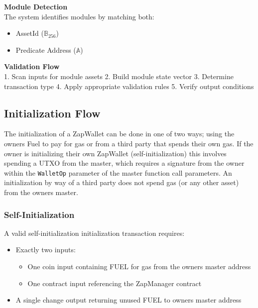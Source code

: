 \textbf{Module Detection}\\
The system identifies modules by matching both:
\begin{itemize}
    \item AssetId ($\mathbb{B}_{256}$)
    \item Predicate Address ($\mathbb{A}$)
\end{itemize}

\textbf{Validation Flow}\\
1. Scan inputs for module assets
2. Build module state vector
3. Determine transaction type
4. Apply appropriate validation rules
5. Verify output conditions




\subsection{Initialization Flow}
The initialization of a ZapWallet can be done in one of two ways; using the owners Fuel  to pay for gas or from a third party that spends their own gas. If the owner is
initializing their own ZapWallet (self-initialization) this involves spending a  UTXO from the master, which requires a signature from the owner within
the \texttt{WalletOp} parameter of the master  function call parameters. An initialization by way of a third party does not spend gas (or any other asset) from the
owners master.

\subsubsection{Self-Initialization}
A valid self-initialization initialization transaction requires:
\begin{itemize}
    \item Exactly two inputs:
        \begin{itemize}
            \item One coin input containing FUEL  for gas from the owners master address
            \item One contract input referencing the ZapManager contract
        \end{itemize}
    \item A single change output returning unused FUEL  to owners master address
\end{itemize}


